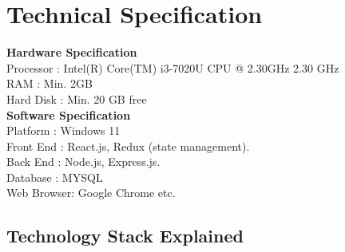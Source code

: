 \section{Technical Specification}
\textbullet \hspace{0.2cm} \textbf{Hardware Specification}\\
Processor	:	Intel(R) Core(TM) i3-7020U CPU @ 2.30GHz 2.30 GHz\\
RAM          	: 	Min. 2GB\\
Hard Disk	: 	Min. 20 GB free\\
\textbullet \hspace{0.2cm} \textbf{Software Specification}\\
Platform	:  	Windows 11\\
Front End	: 	React.js, Redux (state management). \\
Back End	: 	Node.js, Express.js. \\	
Database    : MYSQL\\
Web Browser: 	Google Chrome etc. \\


\subsection{Technology Stack Explained}





